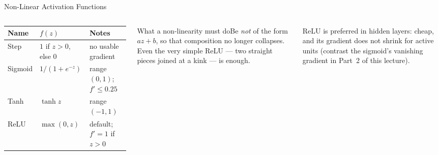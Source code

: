 \documentclass[aspectratio=169,10pt]{beamer}
\begin{document}
\begin{frame}{Non-Linear Activation Functions}
\begin{columns}[T]
\centering\scriptsize\renewcommand{\arraystretch}{1.35}\setlength{\tabcolsep}{3pt}
\begin{tabular}{lll}
\toprule
\textbf{Name}&$f(z)$&\textbf{Notes}\\\midrule
Step&$1$ if $z>0$, else $0$&no usable gradient\\
Sigmoid&$1/(1+e^{-z})$&range $(0,1)$; $f'\le0.25$\\
Tanh&$\tanh z$&range $(-1,1)$\\
ReLU&$\max(0,z)$&default; $f'=1$ if $z>0$\\\bottomrule
\end{tabular}
\vspace{4pt}
\raggedright
\begin{cbox}{What a non-linearity must do}\scriptsize Be \emph{not} of the form $az+b$, so that composition no longer collapses. Even the very simple ReLU --- two straight pieces joined at a kink --- is enough.\end{cbox}
\begin{ibox}\scriptsize ReLU is preferred in hidden layers: cheap, and its gradient does not shrink for active units (contrast the sigmoid's vanishing gradient in Part~2 of this lecture).\end{ibox}
\end{columns}
\end{frame}
\end{document}
